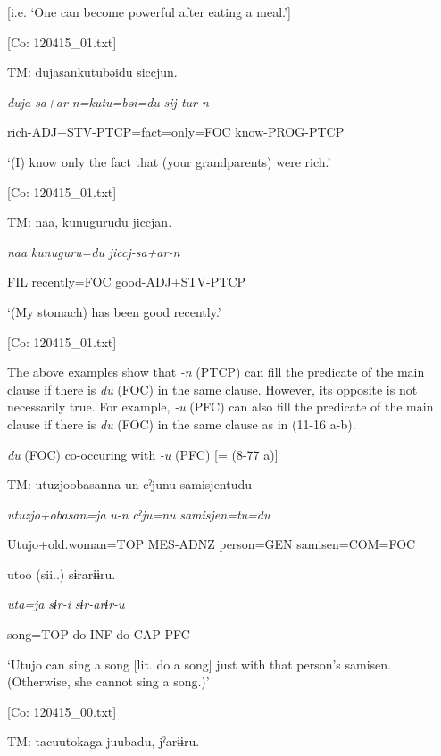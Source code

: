 [i.e. ‘One can become powerful after eating a meal.’]

      [Co: 120415\_01.txt]

  \ex  TM:  dujasankutubəidu  siccjun.

      \textit{duja-sa+ar-n=kutu=bəi=du}  \textit{sij-tur-n}

      rich-ADJ+STV-PTCP=fact=only=FOC  know-PROG-PTCP

      ‘(I) know only the fact that (your grandparents) were rich.’

    [Co: 120415\_01.txt]

  \ex{}

    TM:  naa,  kunugurudu  jiccjan.

      \textit{naa}  \textit{kunuguru=du}  \textit{jiccj-sa+ar-n}

      FIL  recently=FOC  good-ADJ+STV-PTCP

      ‘(My stomach) has been good recently.’

    [Co: 120415\_01.txt]
\z
\z

The above examples show that \textit{-n} (PTCP) can fill the predicate of the main clause if there is \textit{du} (FOC) in the same clause. However, its opposite is not necessarily true. For example, \textit{{}-u} (PFC) can also fill the predicate of the main clause if there is \textit{du} (FOC) in the same clause as in (11-16 a-b).

\ea\label{ex:11-16}  \textit{du} (FOC) co-occuring with \textit{{}-u} (PFC) [= (8-77 a)]

  \ea  TM:  utuzjoobasanna  un  cˀjunu  samisjentudu

      \textit{utuzjo+obasan=ja}  \textit{u-n}  \textit{cˀju=nu}  \textit{samisjen=tu=du}

      Utujo+old.woman=TOP  MES-ADNZ  person=GEN  samisen=COM=FOC

      utoo  (sii..)  sɨrarɨɨru.  

      \textit{uta=ja}  \textit{sɨr-i}  \textit{sɨr-arɨr-u}  

      song=TOP  do-INF  do-CAP-PFC  

      ‘Utujo can sing a song [lit. do a song] just with that person’s samisen. (Otherwise, she cannot sing a song.)’

      [Co: 120415\_00.txt]

  \ex  TM:  tacuu{\textbar}toka{\textbar}ga  juubadu,  jˀarɨɨru.

